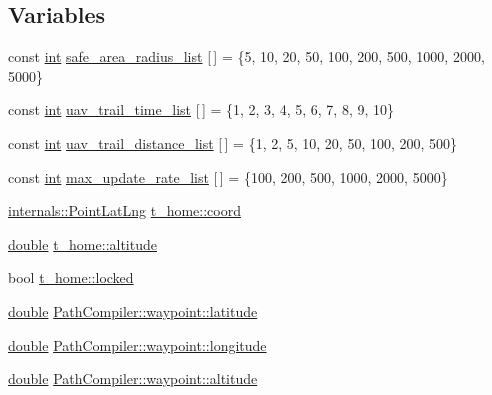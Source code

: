 \subsection*{Variables}
\begin{DoxyCompactItemize}
\item 
const \hyperlink{ioapi_8h_a787fa3cf048117ba7123753c1e74fcd6}{int} \hyperlink{group___o_p_map_plugin_ga508cdf04246e0731ce2b58e5d72844d6}{safe\-\_\-area\-\_\-radius\-\_\-list} \mbox{[}$\,$\mbox{]} = \{5, 10, 20, 50, 100, 200, 500, 1000, 2000, 5000\}
\item 
const \hyperlink{ioapi_8h_a787fa3cf048117ba7123753c1e74fcd6}{int} \hyperlink{group___o_p_map_plugin_ga42a1c15ba77f6bec7efc5e15cc2d7a6b}{uav\-\_\-trail\-\_\-time\-\_\-list} \mbox{[}$\,$\mbox{]} = \{1, 2, 3, 4, 5, 6, 7, 8, 9, 10\}
\item 
const \hyperlink{ioapi_8h_a787fa3cf048117ba7123753c1e74fcd6}{int} \hyperlink{group___o_p_map_plugin_ga8974b27951316cb97856a384f680d85e}{uav\-\_\-trail\-\_\-distance\-\_\-list} \mbox{[}$\,$\mbox{]} = \{1, 2, 5, 10, 20, 50, 100, 200, 500\}
\item 
const \hyperlink{ioapi_8h_a787fa3cf048117ba7123753c1e74fcd6}{int} \hyperlink{group___o_p_map_plugin_ga924197d237c4236b05e045cf5b299e51}{max\-\_\-update\-\_\-rate\-\_\-list} \mbox{[}$\,$\mbox{]} = \{100, 200, 500, 1000, 2000, 5000\}
\item 
\hyperlink{structinternals_1_1_point_lat_lng}{internals\-::\-Point\-Lat\-Lng} \hyperlink{group___o_p_map_plugin_ga6324b0912396582281b54bc6d5a6f38a}{t\-\_\-home\-::coord}
\item 
\hyperlink{_super_l_u_support_8h_a8956b2b9f49bf918deed98379d159ca7}{double} \hyperlink{group___o_p_map_plugin_ga14ce78cb516fe7a0e7f20e423e92d538}{t\-\_\-home\-::altitude}
\item 
bool \hyperlink{group___o_p_map_plugin_ga4cc9a1ca8d219f1aa6d823fab6080f02}{t\-\_\-home\-::locked}
\item 
\hyperlink{_super_l_u_support_8h_a8956b2b9f49bf918deed98379d159ca7}{double} \hyperlink{group___o_p_map_plugin_ga78f3936ec843f0060648b9503702acd6}{Path\-Compiler\-::waypoint\-::latitude}
\item 
\hyperlink{_super_l_u_support_8h_a8956b2b9f49bf918deed98379d159ca7}{double} \hyperlink{group___o_p_map_plugin_ga698954b834d77d2eb539e287bc6bc9e0}{Path\-Compiler\-::waypoint\-::longitude}
\item 
\hyperlink{_super_l_u_support_8h_a8956b2b9f49bf918deed98379d159ca7}{double} \hyperlink{group___o_p_map_plugin_ga538be1c7d40ec1ac89c5faad4012154e}{Path\-Compiler\-::waypoint\-::altitude}
\end{DoxyCompactItemize}
